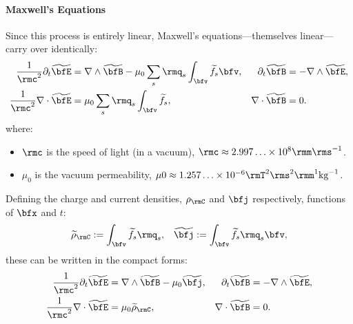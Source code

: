     \shortline

    \paragraph*{Maxwell's Equations} Since this process is entirely linear, Maxwell's equations---themselves linear---carry over identically:
    \begin{align}
        \frac{1}{\rmc^{2}}\partial_{t}\widetilde{\bfE}  &=  \nabla\wedge\widetilde{\bfB} - \mu_{0}\sum_{s}\rmq_{s}\int_{\bfv}\widetilde{f_{s}}\bfv,  &
        \partial_{t}\widetilde{\bfB}  &=  - \nabla\wedge\widetilde{\bfE},  \\
        \frac{1}{\rmc^{2}}\nabla\cdot\widetilde{\bfE}  &=  \mu_{0}\sum_{s}\rmq_{s}\int_{\bfv}\widetilde{f_{s}},  &
        \nabla\cdot\widetilde{\bfB}  &=  0.
    \end{align}
    where:
    \begin{itemize}
        \item  $\rmc$ is the speed of light (in a vacuum), $\rmc  \approx  2.997\ldots\times 10^{8}\rmm\rms^{- 1}$.
        \item  $\mu_{0}$ is the vacuum permeability, $\mu{0}  \approx  1.257\ldots\times 10^{- 6}\rmT^{2}\rms^{2}\rmm^{1}{\rm kg}^{- 1}$.
    \end{itemize}

    Defining the charge and current densities, $\rho_{\rmC}$ and $\bfj$ respectively, functions of $\bfx$ and $t$:
    \begin{align}
        \widetilde{\rho}_{\rmC}  :=  \int_{\bfv}\widetilde{f_{s}}\rmq_{s},  &&
               \widetilde{\bfj}  :=  \int_{\bfv}\widetilde{f_{s}}\rmq_{s}\bfv,
    \end{align}
    these can be written in the compact forms:
    \begin{align}
        \frac{1}{\rmc^{2}}\partial_{t}\widetilde{\bfE}  &=  \nabla\wedge\widetilde{\bfB} - \mu_{0}\widetilde{\bfj},  &
        \partial_{t}\widetilde{\bfB}  &=  - \nabla\wedge\widetilde{\bfE},  \label{eqn:Maxwell's equations transient}  \\
        \frac{1}{\rmc^{2}}\nabla\cdot\widetilde{\bfE}  &=  \mu_{0}\widetilde{\rho}_{\rmC},  &
        \nabla\cdot\widetilde{\bfB}  &=  0.  \label{eqn:Maxwell's equations steady-state}
    \end{align}
    
